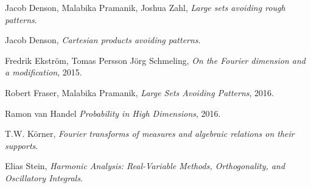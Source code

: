 \documentclass[dvipsnames,letterpaper,12pt]{article}
\numberwithin{equation}{section}
\numberwithin{theorem}{section}
\begin{document}
\begin{thebibliography}{9}

    Jacob Denson, Malabika Pramanik, Joshua Zahl,
    \textit{Large sets avoiding rough patterns}.

    Jacob Denson,
    \textit{Cartesian products avoiding patterns}.

    Fredrik Ekstr\"{o}m, Tomas Persson J\"{o}rg Schmeling,
    \textit{On the {F}ourier dimension and a modification},
    2015.

    Robert Fraser, Malabika Pramanik,
    \textit{Large Sets Avoiding Patterns},
    2016.


    Ramon van Handel
    \textit{Probability in High Dimensions},
    2016.


    T.W. K\"{o}rner,
    \textit{{F}ourier transforms of measures and algebraic relations on their supports}.

    Elias Stein,
    \textit{Harmonic Analysis: Real-Variable Methods, Orthogonality, and Oscillatory Integrals}.


\end{thebibliography}




\end{document}
